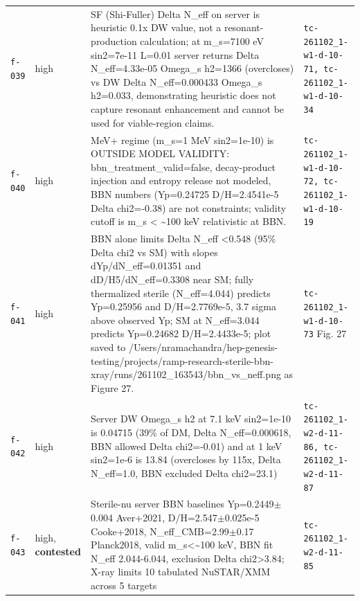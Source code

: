 \documentclass[11pt,a4paper]{article}
\begin{document}
\begin{longtable}{@{}p{}p{}p{}p{}@{}}
\texttt{f-039} & high & SF (Shi-Fuller) Delta N\_eff on server is heuristic 0.1x DW value, not a resonant-production calculation; at m\_s=7100 eV sin2=7e-11 L=0.01 server returns Delta N\_eff=4.33e-05 Omega\_s h2=1366 (overcloses) vs DW Delta N\_eff=0.000433 Omega\_s h2=0.033, demonstrating heuristic does not capture resonant enhancement and cannot be used for viable-region claims. & \texttt{tc-261102\_\allowbreak{}1-w1-d-10-71,\allowbreak{} tc-261102\_\allowbreak{}1-w1-d-10-34} \\
\texttt{f-040} & high & MeV+ regime (m\_s=1 MeV sin2=1e-10) is OUTSIDE MODEL VALIDITY: bbn\_treatment\_valid=false, decay-product injection and entropy release not modeled, BBN numbers (Yp=0.24725 D/H=2.4541e-5 Delta chi2=-0.38) are not constraints; validity cutoff is m\_s \textless{} \textasciitilde{}100 keV relativistic at BBN. & \texttt{tc-261102\_\allowbreak{}1-w1-d-10-72,\allowbreak{} tc-261102\_\allowbreak{}1-w1-d-10-19} \\
\texttt{f-041} & high & BBN alone limits Delta N\_eff \textless{}0.548 (95\% Delta chi2 vs SM) with slopes dYp/dN\_eff=0.01351 and dD/H5/dN\_eff=0.3308 near SM; fully thermalized sterile (N\_eff=4.044) predicts Yp=0.25956 and D/H=2.7769e-5, 3.7 sigma above observed Yp; SM at N\_eff=3.044 predicts Yp=0.24682 D/H=2.4433e-5; plot saved to /Users/nramachandra/hep-genesis-testing/projects/ramp-research-sterile-bbn-xray/runs/261102\_163543/bbn\_vs\_neff.png as Figure 27. & \texttt{tc-261102\_\allowbreak{}1-w1-d-10-73} Fig. 27 \\
\texttt{f-042} & high & Server DW Omega\_s h2 at 7.1 keV sin2=1e-10 is 0.04715 (39\% of DM, Delta N\_eff=0.000618, BBN allowed Delta chi2=-0.01) and at 1 keV sin2=1e-6 is 13.84 (overcloses by 115x, Delta N\_eff=1.0, BBN excluded Delta chi2=23.1) & \texttt{tc-261102\_\allowbreak{}1-w2-d-11-86,\allowbreak{} tc-261102\_\allowbreak{}1-w2-d-11-87} \\
\texttt{f-043} & high, \textbf{contested} & Sterile-nu server BBN baselines Yp=0.2449$\pm$0.004 Aver+2021, D/H=2.547$\pm$0.025e-5 Cooke+2018, N\_eff\_CMB=2.99$\pm$0.17 Planck2018, valid m\_s\textless{}\textasciitilde{}100 keV, BBN fit N\_eff 2.044-6.044, exclusion Delta chi2\textgreater{}3.84; X-ray limits 10 tabulated NuSTAR/XMM across 5 targets & \texttt{tc-261102\_\allowbreak{}1-w2-d-11-85} \\

\end{longtable}
\end{document}
